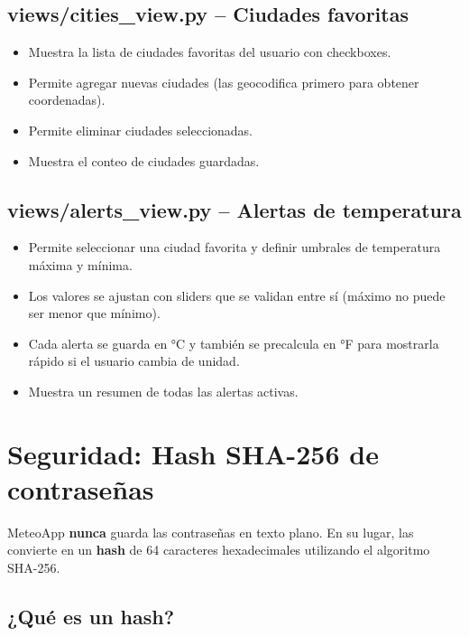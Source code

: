 \documentclass[12pt,a4paper]{article}
\begin{document}
\subsection{views/cities\_view.py -- Ciudades favoritas}

\begin{itemize}
    \item Muestra la lista de ciudades favoritas del usuario con checkboxes.
    \item Permite agregar nuevas ciudades (las geocodifica primero para obtener coordenadas).
    \item Permite eliminar ciudades seleccionadas.
    \item Muestra el conteo de ciudades guardadas.
\end{itemize}

\subsection{views/alerts\_view.py -- Alertas de temperatura}

\begin{itemize}
    \item Permite seleccionar una ciudad favorita y definir umbrales de temperatura máxima y mínima.
    \item Los valores se ajustan con sliders que se validan entre sí (máximo no puede ser menor que mínimo).
    \item Cada alerta se guarda en °C y también se precalcula en °F para mostrarla rápido si el usuario cambia de unidad.
    \item Muestra un resumen de todas las alertas activas.
\end{itemize}

\newpage
\section{Seguridad: Hash SHA-256 de contraseñas}

MeteoApp \textbf{nunca} guarda las contraseñas en texto plano. En su lugar, las convierte en un \textbf{hash} de 64 caracteres hexadecimales utilizando el algoritmo SHA-256.

\subsection{¿Qué es un hash?}
\end{document}
